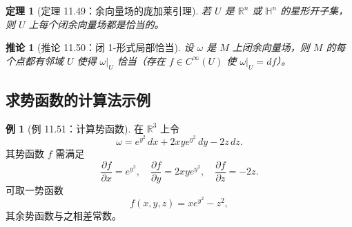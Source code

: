 \documentclass[12pt,a4paper]{article}
\theoremstyle{definition}
\newtheorem{example}{例}[section]
\theoremstyle{plain}
\newtheorem{theorem}{定理}[section]
\newtheorem{corollary}{推论}[section]
\newcommand{\R}{\mathbb{R}}
\newcommand{\Cinf}{C^{\infty}}
\begin{document}
\begin{theorem}[定理 11.49：余向量场的庞加莱引理]
若 $U$ 是 $\R^n$ 或 $\mathbb{H}^n$ 的星形开子集，则 $U$ 上每个闭余向量场都是恰当的。
\end{theorem}

\begin{corollary}[推论 11.50：闭 1-形式局部恰当]
设 $\omega$ 是 $M$ 上闭余向量场，则 $M$ 的每个点都有邻域 $U$ 使得 $\omega|_U$ 恰当（存在 $f\in\Cinf(U)$ 使 $\omega|_U=df$）。
\end{corollary}

\subsection{求势函数的计算法示例}

\begin{example}[例 11.51：计算势函数]
在 $\R^3$ 上令
\[
\omega=e^{y^2}\,dx+2xye^{y^2}\,dy-2z\,dz.
\]
其势函数 $f$ 需满足
\[
\frac{\partial f}{\partial x}=e^{y^2},\quad
\frac{\partial f}{\partial y}=2xye^{y^2},\quad
\frac{\partial f}{\partial z}=-2z.
\]
可取一势函数
\[
f(x,y,z)=x e^{y^2}-z^2,
\]
其余势函数与之相差常数。
\end{example}
\end{document}
